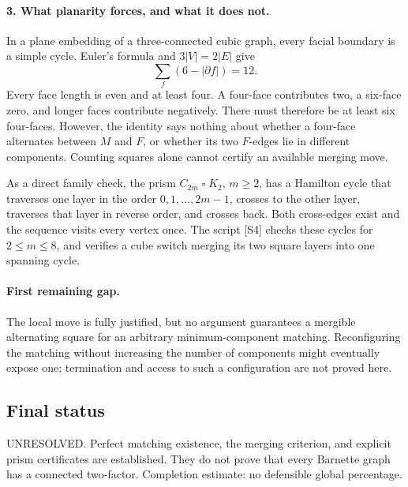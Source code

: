 \documentclass[11pt,a4paper]{article}
\begin{document}
\paragraph{3. What planarity forces, and what it does not.}
In a plane embedding of a three-connected cubic graph, every facial
boundary is a simple cycle. Euler's formula and $3|V|=2|E|$ give
\[
 \sum_{f}(6-|\partial f|)=12.
\]
Every face length is even and at least four. A four-face contributes
two, a six-face zero, and longer faces contribute negatively. There
must therefore be at least six four-faces. However, the identity says
nothing about whether a four-face alternates between $M$ and $F$,
or whether its two $F$-edges lie in different components. Counting
squares alone cannot certify an available merging move.

As a direct family check, the prism $C_{2m}\mathbin{\square}K_2$,
$m\ge2$, has a Hamilton cycle that traverses one layer in the order
$0,1,\ldots,2m-1$, crosses to the other layer, traverses that layer
in reverse order, and crosses back. Both cross-edges exist and the
sequence visits every vertex once. The script [S4] checks these cycles
for $2\le m\le8$, and verifies a cube switch merging its two square
layers into one spanning cycle.

\paragraph{First remaining gap.}
The local move is fully justified, but no argument guarantees a
mergible alternating square for an arbitrary minimum-component
matching. Reconfiguring the matching without increasing the number of
components might eventually expose one; termination and access to such
a configuration are not proved here.

\subsection{Final status}
UNRESOLVED. Perfect matching existence, the merging criterion, and
explicit prism certificates are established. They do not prove that
every Barnette graph has a connected two-factor. Completion estimate:
no defensible global percentage.
\end{document}
